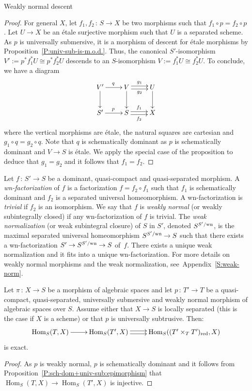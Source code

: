 \documentclass[a4paper,twoside,11pt]{amsart}[2009/07/02] %
\newcommand{\pref}[1]{\eqref{#1}}
\DeclareMathOperator{\Hom}{Hom}
\newcommand{\iso}{\cong} %
\newcommand{\map}[3]{#1\,:\, #2\rightarrow #3}
\newcommand{\etale}{\'{e}tale}
\newcommand{\red}{\mathrm{red}}
\newcommand{\normcmd}[3]{%
#2%
\ifx\\#1\\%
^{\,\mathrm{#3}}%
\else%
^{#1/\mathrm{#3}}%
\fi%
}
\newcommand{\wn}[2]{\normcmd{#1}{#2}{wn}} %
\begin{document}
\begin{section}{Weakly normal descent}
\begin{proof}
For general $X$, let $\map{f_1,f_2}{S}{X}$ be two morphisms such that $f_1\circ
p=f_2\circ p$. Let $U\to X$ be an \etale{} surjective morphism such that $U$ is
a separated scheme. As $p$ is universally submersive, it is a morphism of
descent for \etale{} morphisms by Proposition~\ref{P:univ-sub-is-m.o.d.}. Thus,
the canonical $S'$-isomorphism $V':=p^*f_1^*U\iso p^*f_2^*U$ descends to an
$S$-isomorphism $V:=f_1^* U\iso f_2^* U$. To conclude, we have a diagram
%
$$\xymatrix{%
  V'\ar[r]^{q}\ar[d] & V\ar@<.5ex>[r]^-{g_1}\ar@<-.5ex>[r]_-{g_2}\ar[d]
  & U\ar[d]\\
  S'\ar[r]^{p} & S\ar@<.5ex>[r]^-{f_1}\ar@<-.5ex>[r]_-{f_2} & X%
}$$
%
where the vertical morphisms are \etale{}, the natural squares are cartesian
and $g_1\circ q=g_2\circ q$. Note that $q$ is schematically dominant as $p$ is
schematically dominant and $V\to S$ is \etale{}. We apply the special case of
the proposition to deduce that $g_1=g_2$ and it follows that $f_1=f_2$.
\end{proof}

\begin{xpar}
Let $\map{f}{S'}{S}$ be a dominant, quasi-compact and quasi-separated
morphism. A \emph{wn-factorization} of $f$ is a factorization $f=f_2\circ f_1$
such that $f_1$ is schematically dominant and $f_2$ is a separated universal
homeomorphism. A wn-factorization is \emph{trivial} if $f_2$ is an isomorphism.
We say that $f$ is \emph{weakly normal} (or weakly subintegrally closed) if any
wn-factorization of $f$ is trivial. The \emph{weak normalization} (or weak
subintegral closure) of $S$ in $S'$, denoted $\wn{S'}{S}$, is the maximal
separated universal homeomorphism ${\wn{S'}{S}\to S}$ such that there exists a
wn-factorization $S'\to \wn{S'}{S}\to S$ of~$f$. There exists a unique weak
normalization and it fits into a unique wn-factorization.
%
For more details on weakly normal morphisms and the weak normalization, see\
Appendix~\ref{S:weak-norm}.
\end{xpar}





\begin{theorem}\label{T:h-descent}
Let $\map{\pi}{X}{S}$ be a morphism of algebraic spaces and let
$\map{p}{T'}{T}$ be a quasi-compact, quasi-separated, universally submersive
and weakly normal
morphism of algebraic spaces over $S$. Assume either that $X\to S$ is locally
separated (this is the case if $X$ is a scheme) or that $p$ is universally
subtrusive. Then:
%
$$\xymatrix{%
\Hom_S(T,X)\ar[r] & \Hom_{S}(T',X)\ar@<.5ex>[r]\ar@<-.5ex>[r]
 & \Hom_S((T'\times_T T')_\red,X)}$$
%
is exact.
\end{theorem}
\begin{proof}
As $p$ is weakly normal,
$p$ is schematically dominant and it follows from
Proposition~\pref{P:sch-dom+univ-sub:epimorphism} that $\Hom_S(T,X)\to
\Hom_{S}(T',X)$ is injective.


\end{proof}
\end{section}
\end{document}
